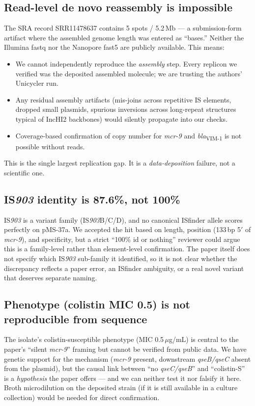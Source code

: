 \documentclass[11pt,letterpaper]{article}
\begin{document}
\subsection{Read-level de novo reassembly is impossible}
The SRA record SRR11478637 contains 5 spots / 5.2\,Mb --- a submission-form artifact where the assembled genome length was entered as ``bases.'' Neither the Illumina fastq nor the Nanopore fast5 are publicly available. This means:
\begin{itemize}
\item We cannot independently reproduce the \textit{assembly} step. Every replicon we verified was the deposited assembled molecule; we are trusting the authors' Unicycler run.
\item Any residual assembly artifacts (mis-joins across repetitive IS elements, dropped small plasmids, spurious inversions across long-repeat structures typical of IncHI2 backbones) would silently propagate into our checks.
\item Coverage-based confirmation of copy number for \textit{mcr-9} and \textit{bla}\textsubscript{VIM-1} is not possible without reads.
\end{itemize}
This is the single largest replication gap. It is a \textit{data-deposition} failure, not a scientific one.

\subsection{IS\textit{903} identity is 87.6\%, not 100\%}
IS\textit{903} is a variant family (IS\textit{903}B/C/D), and no canonical ISfinder allele scores perfectly on pMS-37a. We accepted the hit based on length, position (133\,bp 5$'$ of \textit{mcr-9}), and specificity, but a strict ``100\% id or nothing'' reviewer could argue this is a family-level rather than element-level confirmation. The paper itself does not specify which IS\textit{903} sub-family it identified, so it is not clear whether the discrepancy reflects a paper error, an ISfinder ambiguity, or a real novel variant that deserves separate naming.

\subsection{Phenotype (colistin MIC 0.5) is not reproducible from sequence}
The isolate's colistin-susceptible phenotype (MIC 0.5\,$\mu$g/mL) is central to the paper's ``silent \textit{mcr-9}'' framing but cannot be verified from public data. We have genetic support for the mechanism (\textit{mcr-9} present, downstream \textit{qseB/qseC} absent from the plasmid), but the causal link between ``no \textit{qseC/qseB}'' and ``colistin-S'' is a \textit{hypothesis} the paper offers --- and we can neither test it nor falsify it here. Broth microdilution on the deposited strain (if it is still available in a culture collection) would be needed for direct confirmation.
\end{document}
